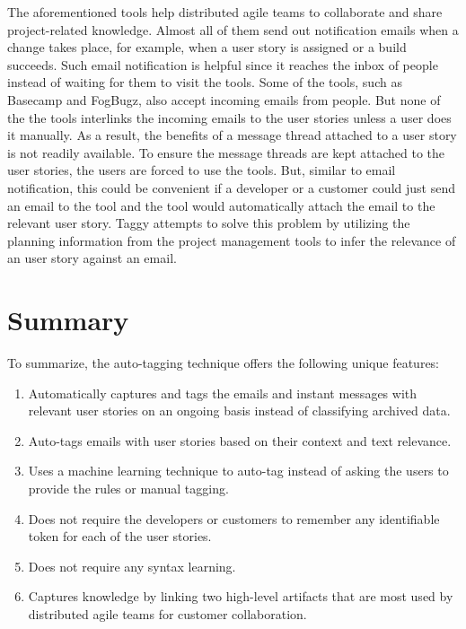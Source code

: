 The aforementioned tools help distributed agile teams to collaborate and share project-related knowledge. Almost all of them send out notification emails when a change takes place, for example, when a user story is assigned or a build succeeds. Such email notification is helpful since it reaches the inbox of people instead of waiting for them to visit the tools. Some of the tools, such as Basecamp and FogBugz, also accept incoming emails from people. But none of the the tools interlinks the incoming emails to the user stories unless a user does it manually. As a result, the benefits of a message thread attached to a user story is not readily available. To ensure the message threads are kept attached to the user stories, the users are forced to use the tools. But, similar to email notification, this could be convenient if a developer or a customer could just send an email to the tool and the tool would automatically attach the email to the relevant user story. Taggy attempts to solve this problem by utilizing the planning information from the project management tools to infer the relevance of an user story against an email.

\section{Summary}
To summarize, the auto-tagging technique offers the following unique features:
\begin{enumerate}
	\item Automatically captures and tags the emails and instant messages with relevant user stories on an ongoing basis instead of classifying archived data.
	\item Auto-tags emails with user stories based on their context and text relevance.
	\item Uses a machine learning technique to auto-tag instead of asking the users to provide the rules or manual tagging.
	\item Does not require the developers or customers to remember any identifiable token for each of the user stories.
	\item Does not require any syntax learning.
	\item Captures knowledge by linking two high-level artifacts that are most used by distributed agile teams for customer collaboration.
\end{enumerate}


